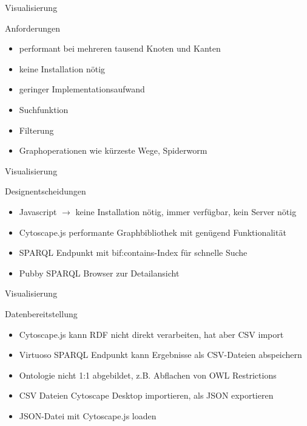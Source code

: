 \documentclass[14pt,aspectratio=1610]{beamer}
\begin{document}
\begin{frame}{Visualisierung}
\begin{block}{Anforderungen}
\begin{itemize}
\item performant bei mehreren tausend Knoten und Kanten 
\item keine Installation nötig
\item geringer Implementationsaufwand
\item Suchfunktion
\item Filterung
\item Graphoperationen wie kürzeste Wege, Spiderworm
\end{itemize}
\end{block}
\end{frame}

\begin{frame}{Visualisierung}
\begin{block}{Designentscheidungen}
\begin{itemize}
\item Javascript $\rightarrow$ keine Installation nötig, immer verfügbar, kein Server nötig
\item Cytoscape.js performante Graphbibliothek mit genügend Funktionalität
\item SPARQL Endpunkt mit bif:contains-Index für schnelle Suche
\item Pubby SPARQL Browser zur Detailansicht 
\end{itemize}
\end{block}
\end{frame}

\begin{frame}{Visualisierung}
\begin{block}{Datenbereitstellung}
\begin{itemize}
\item Cytoscape.js kann RDF nicht direkt verarbeiten, hat aber CSV import
\item Virtuoso SPARQL Endpunkt kann Ergebnisse als CSV-Dateien abspeichern
\item Ontologie nicht 1:1 abgebildet, z.B. Abflachen von OWL Restrictions 
\item CSV Dateien Cytoscape Desktop importieren, als JSON exportieren
\item JSON-Datei mit Cytoscape.js loaden
\end{itemize}
\end{block}
\end{frame}
\end{document}

